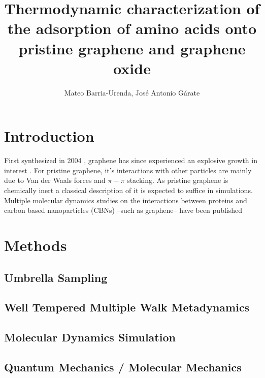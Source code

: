 \documentclass[twoside,twocolumn,9pt]{article}
\author{Mateo Barria-Urenda, José Antonio Gárate}
\title{Thermodynamic characterization of the adsorption of amino acids
  onto pristine graphene and graphene oxide}
\date{}
\begin{document}
\maketitle

\abstract{}

\section{Introduction}


First synthesized in 2004 \cite{Novoselov_2004}, graphene has since
experienced an explosive growth in interest \cite{Randviir_2014}.  For
pristine graphene, it's interactions with other particles are mainly
due to Van der Waals forces and $\pi-\pi$ stacking. \cite{Zuo_2012} As
pristine graphene is chemically inert \cite{Eftekhari_2017} a
classical description of it is expected to suffice in simulations.
Multiple molecular dynamics studies on the interactions between
proteins and carbon based nanoparticles (CBNs) --such as graphene--
have been published \cite{Zheng_2003, Ge_2011, Zuo_2012, Chong_2015,
  Duan_2015, Shityakov_2015, Al_Qattan_2018,Puigpelat_2019,
  Gonz_lez_Durruthy_2020, Li_2020}





\section{Methods}

\subsection{Umbrella Sampling}

\subsection{Well Tempered Multiple Walk Metadynamics}

\subsection{Molecular Dynamics Simulation}

\subsection{Quantum Mechanics / Molecular Mechanics}
\end{document}
